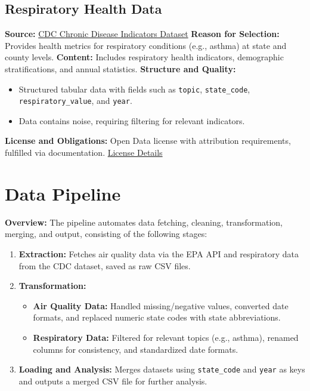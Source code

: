 \documentclass[a4paper,12pt]{article}
\begin{document}
\subsection*{Respiratory Health Data}
\textbf{Source:} \href{https://data.cdc.gov/Chronic-Disease-Indicators/U-S-Chronic-Disease-Indicators/hksd-2xuw}{CDC Chronic Disease Indicators Dataset}  
\textbf{Reason for Selection:} Provides health metrics for respiratory conditions (e.g., asthma) at state and county levels.  
\textbf{Content:} Includes respiratory health indicators, demographic stratifications, and annual statistics.  
\textbf{Structure and Quality:}
\begin{itemize}
    \item Structured tabular data with fields such as \texttt{topic}, \texttt{state\_code}, \texttt{respiratory\_value}, and \texttt{year}.
    \item Data contains noise, requiring filtering for relevant indicators.
\end{itemize}
\textbf{License and Obligations:}  
Open Data license with attribution requirements, fulfilled via documentation.  
\href{https://opendatacommons.org/licenses/odbl/1-0/}{License Details}

\section*{Data Pipeline}

\textbf{Overview:}  
The pipeline automates data fetching, cleaning, transformation, merging, and output, consisting of the following stages:
\begin{enumerate}
    \item \textbf{Extraction:} Fetches air quality data via the EPA API and respiratory data from the CDC dataset, saved as raw CSV files.
    \item \textbf{Transformation:}
    \begin{itemize}
        \item \textbf{Air Quality Data:} Handled missing/negative values, converted date formats, and replaced numeric state codes with state abbreviations.
        \item \textbf{Respiratory Data:} Filtered for relevant topics (e.g., asthma), renamed columns for consistency, and standardized date formats.
    \end{itemize}
    \item \textbf{Loading and Analysis:} Merges datasets using \texttt{state\_code} and \texttt{year} as keys and outputs a merged CSV file for further analysis.
\end{enumerate}
\end{document}
